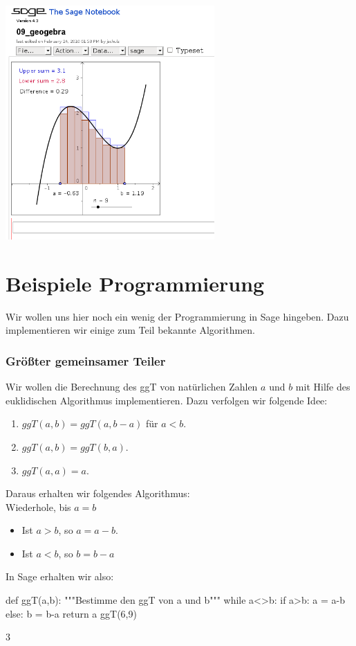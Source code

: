 \documentclass[fontsize=12pt,paper=a4,twoside,bibtotoc,idxtotoc,
liststotoc,pagesize,BCOR1.2cm,DIV15,chapterprefix,pagesize=pdftex]{scrbook}
\theoremstyle{plain}
\theoremstyle{definition}
\theoremstyle{remark}
\begin{document}
\begin{center}
\includegraphics[width=0.6\textwidth]{geogebra.png}
\end{center}

\section{Beispiele Programmierung}
Wir wollen uns hier noch ein wenig der Programmierung in Sage hingeben. Dazu implementieren wir 
einige zum Teil bekannte Algorithmen.
\subsubsection{Größter gemeinsamer Teiler}
Wir wollen die
Berechnung des ggT von natürlichen Zahlen $a$ und $b$ mit Hilfe des
euklidischen Algorithmus implementieren. Dazu verfolgen wir folgende Idee:
\begin{enumerate}
\item  $ggT(a,b)=ggT(a,b-a)$ für $a<b$.
\item $ggT(a,b)=ggT(b,a)$.
\item $ggT(a,a)=a$.
\end{enumerate}
Daraus erhalten wir folgendes Algorithmus:\\
Wiederhole,  bis $a=b$
\begin{itemize} 
\item Ist $a>b$, so $a=a-b$.
\item Ist $a<b$, so $b=b-a$ 
\end{itemize}
In Sage erhalten wir also:
\begin{sagein}
def ggT(a,b):  
    """Bestimme den ggT von a und b"""
    while a<>b:
        if a>b:
            a = a-b
        else: 
            b = b-a
    return a
ggT(6,9)
\end{sagein}
\begin{sageout}
3  
\end{sageout}
\end{document}
